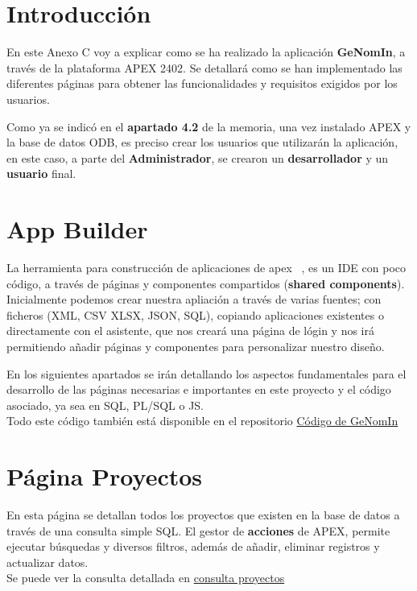 \section{Introducción}
En este Anexo C voy a explicar como se ha realizado la aplicación \textbf{GeNomIn}, a través de la plataforma \acrfull{APEX} 2402.
Se detallará como se han implementado las diferentes páginas para obtener las funcionalidades y requisitos exigidos por los usuarios.

Como ya se indicó en el \textbf{apartado 4.2} de la memoria, una vez instalado \acrshort{APEX} y la base de datos \acrfull{ODB}, es preciso crear los usuarios que utilizarán la aplicación, en este caso, a parte del \textbf{Administrador}, se crearon un \textbf{desarrollador} y un \textbf{usuario} final.

\section{App Builder}
La herramienta para construcción de aplicaciones de apex ~\cite{OracleAPEXAdministration}, es un \acrshort{IDE} con poco código, a través de páginas y componentes compartidos (\textbf{shared components}).
Inicialmente podemos crear nuestra apliación a través de varias fuentes; con ficheros (XML, CSV XLSX, JSON, SQL), copiando aplicaciones existentes o directamente con el asistente, que nos creará una página de lógin y nos irá permitiendo añadir páginas y componentes para personalizar nuestro diseño.

En los siguientes apartados se irán detallando los aspectos fundamentales para el desarrollo de las páginas necesarias e importantes en este proyecto y el código asociado, ya sea en \acrshort{SQL}, \acrshort{PL/SQL} o \acrshort{JS}.\\ 
Todo este código también está disponible en el repositorio \href{https://github.com/far0010/TFGUBU-Fran_Arroyo/tree/main/project-docs/memoria/sql}{Código de GeNomIn}

\section{Página Proyectos}
En esta página se detallan todos los proyectos que existen en la base de datos a través de una consulta simple \acrshort{SQL}. El gestor de \textbf{acciones} de \acrshort{APEX}, permite ejecutar búsquedas y diversos filtros, además de añadir, eliminar registros y actualizar datos.\\ 
Se puede ver la consulta detallada en \href{https://github.com/far0010/TFGUBU-Fran_Arroyo/blob/main/project-docs/memoria/sql/consulta_proyectos.sql}{consulta proyectos}
